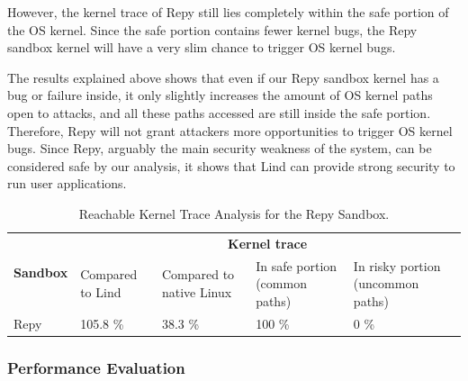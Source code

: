 However, the kernel trace of Repy still lies completely within the safe
portion of the OS kernel. 
Since the safe portion contains fewer kernel bugs, the Repy sandbox kernel
will have a very slim chance to trigger OS kernel bugs.

The results explained above shows that even if our Repy sandbox kernel has a
bug or failure inside, 
it only slightly increases the amount of OS kernel paths open to attacks,
and all these paths accessed are still inside the safe portion. 
Therefore, Repy will not grant attackers more opportunities to trigger OS
kernel bugs. 
Since Repy, arguably the main security weakness of the system, can be
considered safe by our analysis, 
it shows that Lind can provide strong security to run user applications.

\begin{table}
\centering
\scriptsize
\caption{Reachable Kernel Trace Analysis for the Repy Sandbox. }
\begin{tabular}{|l|l|l|l|l|}
  \hline
  \multirow{3}{.8cm}{\bf Sandbox} & \multicolumn{4}{c|}{\bf Kernel trace} \\ \cline{2-5}
  & \multirow{2}{1cm}{Compared to Lind} & 
  \multirow{2}{1.3cm}{Compared to native Linux} & \multirow{2}{1.7cm}{In safe portion 
  (common paths)} & \multirow{2}{1.9cm}{In risky portion (uncommon paths)} \\
  & & & & \\  \hline
  
  Repy & 105.8 \% & 38.3 \% & 100 \%  & 0 \%  \\
  \hline
\end{tabular}
\label{table:trace-Repy}
\end{table}

\subsubsection{Performance Evaluation}
\label{Performance-Evaluation}

